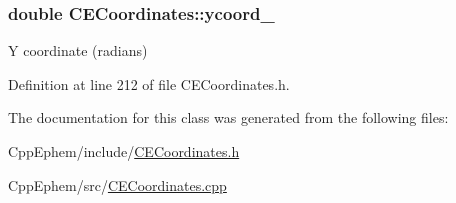 \hypertarget{class_c_e_coordinates_ad95d1b014d83e11c93be8e74eb4957df}{}
\subsubsection[{ycoord\+\_\+}]{\setlength{\rightskip}{0pt plus 5cm}double C\+E\+Coordinates\+::ycoord\+\_\+\hspace{0.3cm}{\ttfamily [protected]}}\label{class_c_e_coordinates_ad95d1b014d83e11c93be8e74eb4957df}


Y coordinate (radians) 



Definition at line 212 of file C\+E\+Coordinates.\+h.



The documentation for this class was generated from the following files\+:\begin{DoxyCompactItemize}
\item 
Cpp\+Ephem/include/\hyperlink{_c_e_coordinates_8h}{C\+E\+Coordinates.\+h}\item 
Cpp\+Ephem/src/\hyperlink{_c_e_coordinates_8cpp}{C\+E\+Coordinates.\+cpp}\end{DoxyCompactItemize}
